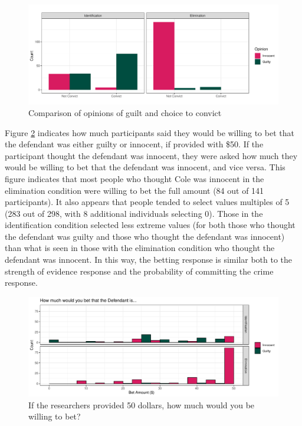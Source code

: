 \documentclass[print]{nuthesis}
\begin{document}
\begin{figure}

{\centering \includegraphics[width=\linewidth]{thesis_files/figure-latex/opinionguilt-1} 

}

\caption{Comparison of opinions of guilt and choice to convict}\label{fig:opinionguilt}
\end{figure}

Figure \ref{fig:betting} indicates how much participants said they would be willing to bet that the defendant was either guilty or innocent, if provided with \$50.
If the participant thought the defendant was innocent, they were asked how much they would be willing to bet that the defendant was innocent, and vice versa.
This figure indicates that most people who thought Cole was innocent in the elimination condition were willing to bet the full amount (84 out of 141 participants).
It also appears that people tended to select values multiples of 5 (283 out of 298, with 8 additional individuals selecting 0).
Those in the identification condition selected less extreme values (for both those who thought the defendant was guilty and those who thought the defendant was innocent) than what is seen in those with the elimination condition who thought the defendant was innocent.
In this way, the betting response is similar both to the strength of evidence response and the probability of committing the crime response.

\begin{figure}

{\centering \includegraphics[width=\linewidth]{thesis_files/figure-latex/betting-1} 

}

\caption{If the researchers provided 50 dollars, how much would you be willing to bet?}\label{fig:betting}
\end{figure}
\end{document}
